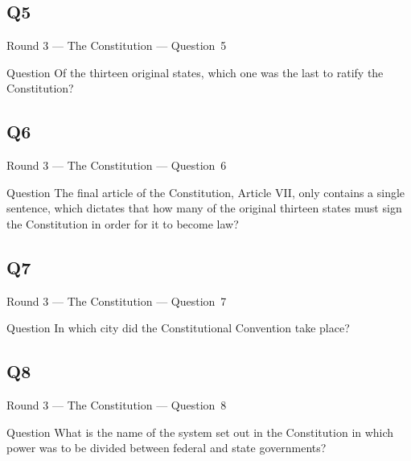 \documentclass[11pt,draft]{beamer}
\begin{document}
\subsection*{Q5}
\begin{frame}[t]{Round 3 --- The Constitution --- \mbox{Question 5}}
    \begin{block}{Question}
        Of the thirteen original states, which one was the last to ratify the Constitution?
    \end{block}
\end{frame}
\subsection*{Q6}
\begin{frame}[t]{Round 3 --- The Constitution --- \mbox{Question 6}}
    \begin{block}{Question}
        The final article of the Constitution, Article VII, only contains a single sentence, which dictates that how many of the original thirteen states must sign the Constitution in order for it to become law?
    \end{block}
\end{frame}
\subsection*{Q7}
\begin{frame}[t]{Round 3 --- The Constitution --- \mbox{Question 7}}
    \begin{block}{Question}
        In which city did the Constitutional Convention take place?
    \end{block}
\end{frame}
\subsection*{Q8}
\begin{frame}[t]{Round 3 --- The Constitution --- \mbox{Question 8}}
    \begin{block}{Question}
        What is the name of the system set out in the Constitution in which power was to be divided between federal and state governments?
    \end{block}
\end{frame}
\end{document}
